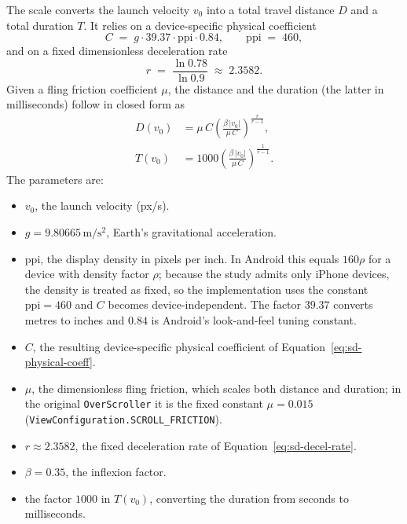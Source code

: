 The scale converts the launch velocity $v_0$ into a total travel distance $D$ and a total duration $T$. It relies on a device-specific physical coefficient
\begin{equation}
  C \;=\; g \cdot 39.37 \cdot \mathrm{ppi} \cdot 0.84,
  \qquad
  \mathrm{ppi} \;=\; 460,
  \label{eq:sd-physical-coeff}
\end{equation}
and on a fixed dimensionless deceleration rate
\begin{equation}
  r \;=\; \frac{\ln 0.78}{\ln 0.9} \;\approx\; 2.3582 .
  \label{eq:sd-decel-rate}
\end{equation}
Given a fling friction coefficient $\mu$, the distance and the duration (the latter in milliseconds) follow in closed form as
\begin{align}
  D(v_0) &= \mu\,C \left( \frac{\beta\,\lvert v_0 \rvert}{\mu\,C} \right)^{\!\frac{r}{r-1}}, \label{eq:sd-fling-distance}\\[2pt]
  T(v_0) &= 1000 \left( \frac{\beta\,\lvert v_0 \rvert}{\mu\,C} \right)^{\!\frac{1}{r-1}}. \label{eq:sd-fling-duration}
\end{align}
The parameters are:
\begin{itemize}
  \item $v_0$, the launch velocity (px/s).
  \item $g = 9.80665\,\mathrm{m/s^2}$, Earth's gravitational acceleration.
  \item $\mathrm{ppi}$, the display density in pixels per inch. In Android this equals $160\rho$ for a device with density factor $\rho$; because the study admits only iPhone devices, the density is treated as fixed, so the implementation uses the constant $\mathrm{ppi} = 460$ and $C$ becomes device-independent. The factor $39.37$ converts metres to inches and $0.84$ is Android's look-and-feel tuning constant.
  \item $C$, the resulting device-specific physical coefficient of Equation~\eqref{eq:sd-physical-coeff}.
  \item $\mu$, the dimensionless fling friction, which scales both distance and duration; in the original \texttt{OverScroller} it is the fixed constant $\mu = 0.015$ (\texttt{ViewConfiguration.SCROLL\_FRICTION}).
  \item $r \approx 2.3582$, the fixed deceleration rate of Equation~\eqref{eq:sd-decel-rate}.
  \item $\beta = 0.35$, the inflexion factor.
  \item the factor $1000$ in $T(v_0)$, converting the duration from seconds to milliseconds.
\end{itemize}

